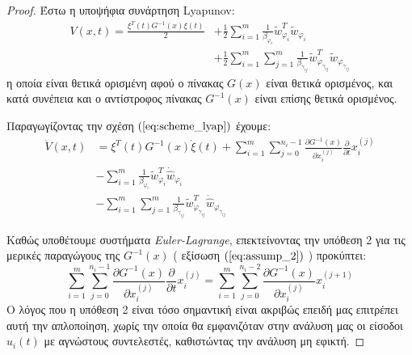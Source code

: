 \begin{proof}
Έστω η υποψήφια συνάρτηση Lyapunov:
\begin{equation}
	\begin{split}
	V(x,t) = \frac{\xi^T(t) G^{-1}(x) \xi(t)}{2} 
		   &+ \frac{1}{2} \sum_{i=1}^{m} \frac{1}{\beta_{\varphi_i} }
		   \tilde{w}_{\varphi_i}^{T} \tilde{w}_{\varphi_i} \\
		   &+ \frac{1}{2} \sum_{i=1}^{m} \sum_{j=1}^{m} \frac{1}{\beta_{\gamma_{ij}}}
		   \tilde{w}_{\varphi_{\gamma_{ij}}}^{T} \tilde{w}_{\varphi_{\gamma_{ij}}}
	\end{split}
	\label{eq:scheme_lyap}
\end{equation}
η οποία είναι θετικά ορισμένη αφού ο πίνακας $G(x)$ είναι θετικά ορισμένος, και κατά συνέπεια και ο αντίστροφος πίνακας $G^{-1}(x)$ είναι επίσης θετικά ορισμένος.

Παραγωγίζοντας την σχέση $(\ref{eq:scheme_lyap})$ έχουμε:
\begin{equation}
\begin{split}
	\dot{V}(x,t) &= \xi^T(t) G^{-1}(x) \dot{\xi}(t)
		   + \sum_{i=1}^{m} \sum_{j=0}^{n_i - 1} 
		     \frac{\partial G^{-1}(x) }{\partial x_i^{(j)}} 
		     \frac{\partial }{\partial t} x_i^{(j)} \\
	& - \sum_{i=1}^{m} \frac{1}{\beta_{\varphi_i} }
	\tilde{w}_{\varphi_i}^{T} \dot{\hat{w}}_{\varphi_i} \\
	& - \sum_{i=1}^{m} \sum_{j=1}^{m} \frac{1}{\beta_{\gamma_{ij}}}
	\tilde{w}_{\varphi_{\gamma_{ij}}}^{T} \dot{\hat{w}}_{\varphi_{\gamma_{ij}}}
\end{split}
\label{eq:scheme_lyap_derivative}
\end{equation}

Καθώς υποθέτουμε συστήματα \emph{Euler-Lagrange}, επεκτείνοντας την υπόθεση 2 για τις μερικές παραγώγους της $G^{-1}(x)$ ( εξίσωση $(\ref{eq:assump_2})$ ) προκύπτει:
\begin{equation*}
	\sum_{i=1}^{m} \sum_{j=0}^{n_i - 1} 
	\frac{\partial G^{-1}(x) }{\partial x_i^{(j)}} 
	\frac{\partial }{\partial t} x_i^{(j)} = 
	\sum_{i=1}^{m} \sum_{j=0}^{n_i - 2} 
	\frac{\partial G^{-1}(x) }{\partial x_i^{(j)}} 
	x_i^{(j +1)}
\end{equation*}
Ο λόγος που η υπόθεση 2 είναι τόσο σημαντική είναι ακριβώς επειδή μας επιτρέπει αυτή την απλοποίηση, χωρίς την οποία θα εμφανιζόταν στην ανάλυση μας οι είσοδοι $u_i(t)$ με αγνώστους συντελεστές, καθιστώντας την ανάλυση μη εφικτή.


\end{proof}
